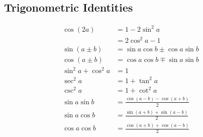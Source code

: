\documentclass[fleqn, 8pt]{amsart}
\theoremstyle{definition}
\theoremstyle{theorem}
\begin{document}
\begin{multicols}{2}
\begin{spacing}{0.7}
\part{Trigonometric Identities}

\begin{align*}
	\cos(2 a) &= 1 - 2 \sin^2 a\\
	&= 2 \cos^2 a - 1\\
	\sin(a \pm b) &= \sin a \cos b \pm \cos a \sin b\\
	\cos(a \pm b) &= \cos a \cos b \mp \sin a \sin b\\
	\sin^2 a + \cos^2 a &= 1\\
	\sec^2 a &= 1 + \tan^2 a\\
	\csc^2 a &= 1 + \cot^2 a\\
	\sin a \sin b &= \frac{\cos(a - b) - \cos(a + b)}{2}\\
	\sin a \cos b &= \frac{\sin(a + b) + \sin(a - b)}{2}\\
	\cos a \cos b &= \frac{\cos(a + b) + \cos(a - b)}{2}
\end{align*}

\end{spacing}

\end{multicols}
\end{document}
